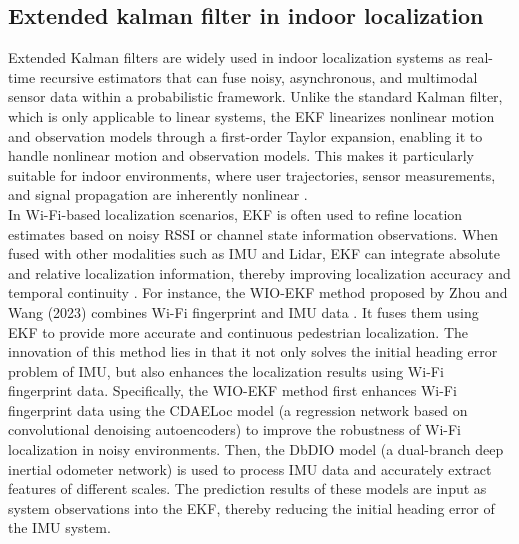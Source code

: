 \documentclass[12pt,a4paper]{article}
\numberwithin{equation}{section}
\begin{document}
\subsection{Extended kalman filter in indoor localization}
Extended Kalman filters are widely used in indoor localization systems as real-time recursive estimators that can fuse noisy, asynchronous, and multimodal sensor data within a probabilistic framework. Unlike the standard Kalman filter, which is only applicable to linear systems, the EKF linearizes nonlinear motion and observation models through a first-order Taylor expansion, enabling it to handle nonlinear motion and observation models. This makes it particularly suitable for indoor environments, where user trajectories, sensor measurements, and signal propagation are inherently nonlinear \cite{barrau2015non}.\\
In Wi-Fi-based localization scenarios, EKF is often used to refine location estimates based on noisy RSSI or channel state information observations. When fused with other modalities such as IMU and Lidar, EKF can integrate absolute and relative localization information, thereby improving localization accuracy and temporal continuity \cite{laoudias2018survey}. For instance, the WIO-EKF method proposed by Zhou and Wang (2023) combines Wi-Fi fingerprint and IMU data \cite{10496456}. It fuses them using EKF to provide more accurate and continuous pedestrian localization. The innovation of this method lies in that it not only solves the initial heading error problem of IMU, but also enhances the localization results using Wi-Fi fingerprint data. Specifically, the WIO-EKF method first enhances Wi-Fi fingerprint data using the CDAELoc model (a regression network based on convolutional denoising autoencoders) to improve the robustness of Wi-Fi localization in noisy environments. Then, the DbDIO model (a dual-branch deep inertial odometer network) is used to process IMU data and accurately extract features of different scales. The prediction results of these models are input as system observations into the EKF, thereby reducing the initial heading error of the IMU system.
\end{document}
